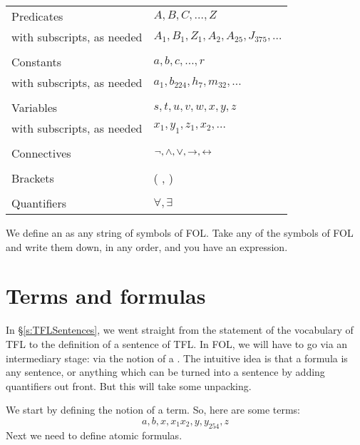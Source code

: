 \begin{center}
\begin{tabular}{l l}
Predicates & $A,B,C,\ldots,Z$\\
with subscripts, as needed & $A_1, B_1,Z_1,A_2,A_{25},J_{375},\ldots$\\
\\
Constants & $a,b,c,\ldots, r$\\
with subscripts, as needed & $a_1, b_{224}, h_7, m_{32},\ldots$\\
\\
Variables & $s, t, u, v, w, x,y,z$\\
with subscripts, as needed & $x_1, y_1, z_1, x_2,\ldots$\\
\\
Connectives & $\neg,\wedge,\vee,\rightarrow,\leftrightarrow$\\
\\
Brackets &( , )\\
\\
Quantifiers & $\forall, \exists$\\
\end{tabular}
\end{center}
We define an  as any string of symbols of FOL. Take any of the symbols of FOL and write them down, in any order, and you have an expression.

\section{Terms and formulas}
\label{s:TermsFormulas}

In \S\ref{s:TFLSentences}, we went straight from the statement of the vocabulary of TFL to the definition of a sentence of TFL. In FOL, we will have to go via an intermediary stage: via the notion of a . The intuitive idea is that a formula is any sentence, or anything which can be turned into a sentence by adding quantifiers out front. But this will take some unpacking.

We start by defining the notion of a term.
So, here are some terms:
	$$a, b, x, x_1 x_2, y, y_{254}, z$$
Next we need to define atomic formulas.


